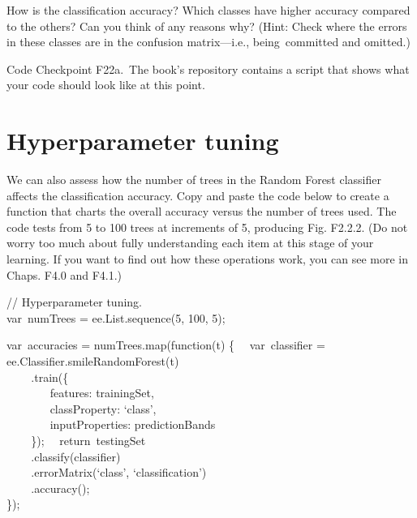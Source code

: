 \documentclass[
  letterpaper,
  DIV=11,
  numbers=noendperiod]{scrreprt}
\begin{document}
How is the classification accuracy? Which classes have higher accuracy
compared to the others? Can you think of any reasons why? (Hint: Check
where the errors in these classes are in the confusion matrix---i.e.,
being~committed and omitted.)

\begin{tcolorbox}[enhanced jigsaw, left=2mm, breakable, rightrule=.15mm, opacityback=0, colframe=quarto-callout-note-color-frame, colbacktitle=quarto-callout-note-color!10!white, arc=.35mm, opacitybacktitle=0.6, toptitle=1mm, colback=white, leftrule=.75mm, title=\textcolor{quarto-callout-note-color}{\faInfo}\hspace{0.5em}{Note}, toprule=.15mm, bottomtitle=1mm, titlerule=0mm, bottomrule=.15mm, coltitle=black]

Code Checkpoint F22a.~The book's repository contains a script that shows
what your code should look like at this point.

\end{tcolorbox}

\hypertarget{hyperparameter-tuning}{%
\section{Hyperparameter tuning}\label{hyperparameter-tuning}}

We can also assess how the number of trees in the Random Forest
classifier affects the classification accuracy. Copy and paste the code
below to create a function that charts the overall accuracy versus the
number of trees used. The code tests from 5 to 100 trees at increments
of 5, producing Fig. F2.2.2. (Do not worry too much about fully
understanding each item at this stage of your learning. If you want to
find out how these operations work, you can see more in Chaps. F4.0 and
F4.1.)

// Hyperparameter tuning.\\
var~numTrees = ee.List.sequence(5, 100, 5);

var~accuracies = numTrees.map(function(t) \{~ ~var~classifier =
ee.Classifier.smileRandomForest(t)\\
\hspace*{0.333em} ~ ~ ~.train(\{\\
\hspace*{0.333em} ~ ~ ~ ~ ~features: trainingSet,\\
\hspace*{0.333em} ~ ~ ~ ~ ~classProperty: `class',\\
\hspace*{0.333em} ~ ~ ~ ~ ~inputProperties: predictionBands\\
\hspace*{0.333em} ~ ~ ~\});~ ~return~testingSet\\
\hspace*{0.333em} ~ ~ ~.classify(classifier)\\
\hspace*{0.333em} ~ ~ ~.errorMatrix(`class', `classification')\\
\hspace*{0.333em} ~ ~ ~.accuracy();\\
\});
\end{document}
